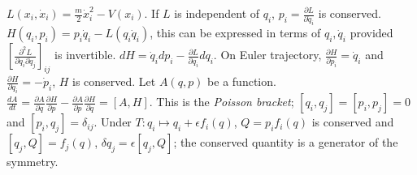 $L(x_i, {\dot x}_i)= {\frac m 2} {\dot x}_i^2-V(x_i)$.  If $L$ is independent of $q_i$,
$p_i= {\frac {\partial L}{\partial {\dot q}_i}}$ is conserved.  $H(q_i, p_i)= p_i{\dot q}_i -L(q_i {\dot q}_i)$,
this can be expressed in terms of $q_i, {\dot q}_i$ 
provided $[{\frac {\partial^2 L} {\partial {\dot q}_i \partial {\dot q}_j}}]_{ij}$ is invertible.
$dH= {\dot q}_i dp_i - {\frac {\partial L}{\partial q_i}} d q_i$.  On Euler trajectory,
${\frac {\partial H}{\partial p_i}} = {\dot q}_i$ and
${\frac {\partial H}{\partial q_i}} = -{\dot p}_i$, $H$ is conserved.  Let $A(q,p)$ be a function.
${\frac {dA}{dt}}=
{\frac {\partial A}{\partial q}} {\frac {\partial H}{\partial p}}
-{\frac {\partial A}{\partial p}} {\frac {\partial H}{\partial q}}= [A,H]$.  This is the
\emph{Poisson bracket}; $[q_i, q_j]=[p_i, p_j]=0$ and $[p_i,q_j]= \delta_{ij}$.  Under
$T: q_i \mapsto q_i + \epsilon f_i(q)$, $Q= p_i f_i(q)$ is conserved and
$[q_j, Q]= f_j(q)$, $\delta q_j= \epsilon [q_j, Q]$; the conserved quantity is a generator of the
symmetry.
